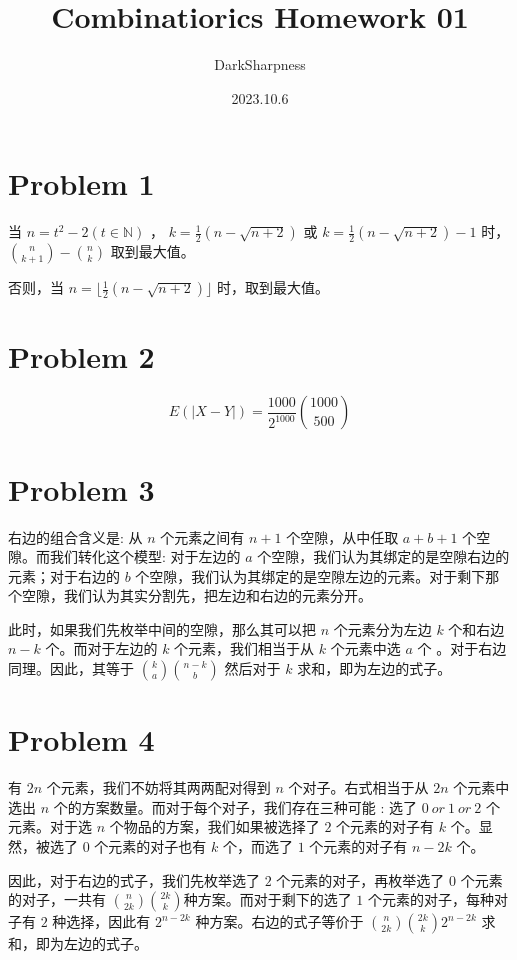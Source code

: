 \documentclass{article}
\title{\heiti\zihao{2} Combinatiorics Homework 01}
\author{DarkSharpness}
\date{2023.10.6}
\begin{document}
	\maketitle

\tableofcontents


\section*{Problem 1}

当 $n = t^2 -2 (t \in \mathbb{N})$ ， $k = \frac{1}{2} (n - \sqrt{n + 2})$ 或 $k = \frac{1}{2} (n - \sqrt{n + 2}) - 1$ 时，${ n \choose {k + 1} } - { n \choose k}$ 取到最大值。

否则，当 $n = \lfloor \frac{1}{2} (n - \sqrt{n + 2}) \rfloor$ 时，取到最大值。


\section*{Problem 2}

$$E(|X-Y|) = \frac{1000}{2^{1000}} {1000 \choose 500}$$

\section*{Problem 3}

右边的组合含义是: 从 $n$ 个元素之间有 $n + 1$ 个空隙，从中任取 $a + b + 1$ 个空隙。而我们转化这个模型: 对于左边的 $a$ 个空隙，我们认为其绑定的是空隙右边的元素；对于右边的 $b$ 个空隙，我们认为其绑定的是空隙左边的元素。对于剩下那个空隙，我们认为其实分割先，把左边和右边的元素分开。

此时，如果我们先枚举中间的空隙，那么其可以把 $n$ 个元素分为左边 $k$ 个和右边 $n - k$ 个。而对于左边的 $k$ 个元素，我们相当于从 $k$ 个元素中选 $a$ 个 。对于右边同理。因此，其等于 ${k \choose a} {n - k \choose b}$ 然后对于 $k$ 求和，即为左边的式子。


\section*{Problem 4}

有 $2n$ 个元素，我们不妨将其两两配对得到 $n$ 个对子。右式相当于从 $2n$ 个元素中选出 $n$ 个的方案数量。而对于每个对子，我们存在三种可能 : 选了 $0 \ or \ 1 \ or \ 2$ 个元素。对于选 $n$ 个物品的方案，我们如果被选择了 $2$ 个元素的对子有 $k$ 个。显然，被选了 $0$ 个元素的对子也有 $k$ 个，而选了 $1$ 个元素的对子有 $n - 2k$ 个。

因此，对于右边的式子，我们先枚举选了 $2$ 个元素的对子，再枚举选了 $0$ 个元素的对子，一共有 ${n \choose 2k} {2k \choose k}$种方案。而对于剩下的选了 $1$ 个元素的对子，每种对子有 $2$ 种选择，因此有 $2^{n - 2k}$ 种方案。右边的式子等价于  ${n \choose 2k} {2k \choose k} 2^{n - 2k}$ 求和，即为左边的式子。
\end{document}
